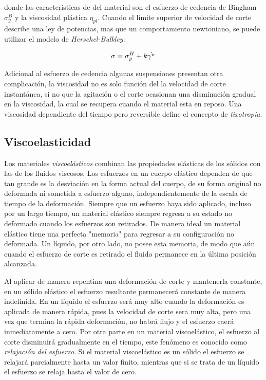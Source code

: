 donde las características de del material son el esfuerzo de cedencia de Bingham $\sigma^{B}_{y}$ y la viscosidad plástica $\eta_{pl}$. Cuando el límite superior de velocidad de corte describe una ley de potencias, mas que un comportamiento newtoniano, se puede utilizar el modelo de \emph{Herschel-Bulkley}:

\begin{equation}\centering
\sigma= \sigma^{H}_{y}+k\dot{\gamma^{n}}
\end{equation}


Adicional al esfuerzo de cedencia algunas suspensiones presentan otra complicación, la viscosidad no es solo función del la velocidad de corte instantánea, si no que la agitación o el corte ocasionan una disminución gradual en la viscosidad, la cual se recupera cuando el material esta en reposo. Una viscosidad dependiente del tiempo pero reversible define el concepto de \emph{tixotropía}. 

\subsection{Viscoelasticidad}

Los materiales \emph{viscoelásticos} combinan las propiedades elásticas de los sólidos con las de los fluidos viscosos. Los esfuerzos en un cuerpo elástico dependen de que tan grande es la desviación en la forma actual del cuerpo, de su forma original no deformada ni sometida a esfuerzo alguno, independientemente de la escala de tiempo de la deformación. Siempre que un esfuerzo haya sido aplicado, incluso por un largo tiempo, un material elástico siempre regresa a su estado no deformado cuando los esfuerzos son retirados. De manera ideal un material elástico tiene una perfecta "memoria" para regresar a su configuración no deformada. Un líquido, por otro lado, no posee esta memoria, de modo que aún cuando el esfuerzo de corte es retirado el fluido permanece en la última posición alcanzada.

Al aplicar de manera repentina una deformación de corte y mantenerla constante, en un sólido elástico el esfuerzo resultante permanecerá constante de manera indefinida. En un líquido el esfuerzo será muy alto cuando la deformación es aplicada de manera rápida, pues la velocidad de corte sera muy alta, pero una vez que termina la rápida deformación, no habrá flujo y el esfuerzo caerá inmediatamente a cero. Por otra parte en un material viscoelástico, el esfuerzo al corte disminuirá gradualmente en el tiempo, este fenómeno es conocido como \emph{relajación del esfuerzo}. Si el material viscoelástico es un sólido el esfuerzo se relajará parcialmente hasta un valor finito, mientras que si se trata de un líquido el esfuerzo se relaja hasta el valor de cero. 

